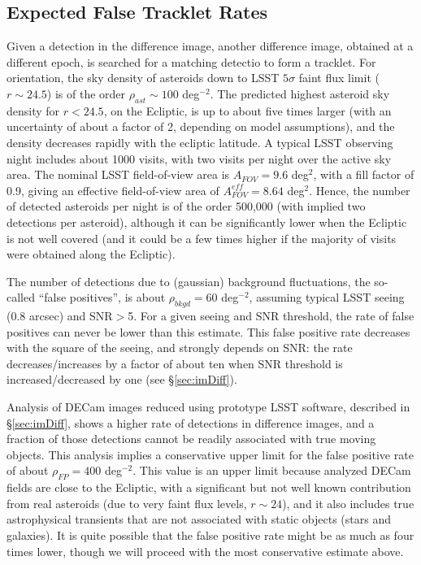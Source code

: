\subsection{Expected False Tracklet Rates} 

Given a detection in the difference image,  another difference image, obtained at a different epoch, 
is searched for a matching detectio to form a tracklet. For orientation, the sky 
density of asteroids down to LSST $5\sigma$ faint flux limit ($r \sim 24.5$) is of the order 
$\rho_{ast} \sim 100$ deg$^{-2}$. The predicted highest asteroid sky density for $r<24.5$, 
on the Ecliptic, is up to about five times larger (with an uncertainty of about a factor of 2, 
depending on model assumptions), and the density decreases rapidly with the ecliptic latitude. 
A typical LSST observing night includes about 1000 visits, with two visits per night over 
the active sky area. The nominal LSST field-of-view area is $A_{FOV}=9.6$ deg$^2$, with a 
fill factor of 0.9, giving an effective field-of-view area of $A_{FOV}^{eff}=8.64$ deg$^2$. Hence, 
the number of detected asteroids per night is of the order 500,000 (with implied two detections 
per asteroid), although it can be significantly lower when the Ecliptic is not well covered (and 
it could be a few times higher if the majority of visits were obtained along the Ecliptic). 

The number of detections due to (gaussian) background fluctuations, the so-called ``false 
positives'', is about $\rho_{bkgd} = 60$ deg$^{-2}$, assuming typical LSST seeing (0.8 arcsec) 
and SNR$>$5. For a given seeing and SNR threshold, the rate of false positives can never be 
lower than this estimate. This false positive rate decreases with the square of the seeing, and 
strongly depends on SNR: the rate decreases/increases by a factor of about ten when SNR 
threshold is increased/decreased by one (see \S\ref{sec:imDiff}). 

Analysis of DECam images reduced using prototype LSST software, described in \S\ref{sec:imDiff},  
shows a higher rate of detections in difference images, and a fraction of those detections 
cannot be readily associated with true moving objects. This analysis implies a conservative 
upper limit for the false positive rate of about $\rho_{FP} =  400$ deg$^{-2}$. This value 
is an upper limit because analyzed DECam fields are close to the Ecliptic, with a significant but
not well known contribution from real asteroids (due to very faint flux levels, $r \sim 24$),
and it also includes true astrophysical transients that are not associated with static objects
(stars and galaxies). It is quite possible that the false positive rate might be as much as four 
times lower, though we will proceed with the most conservative estimate above. 

